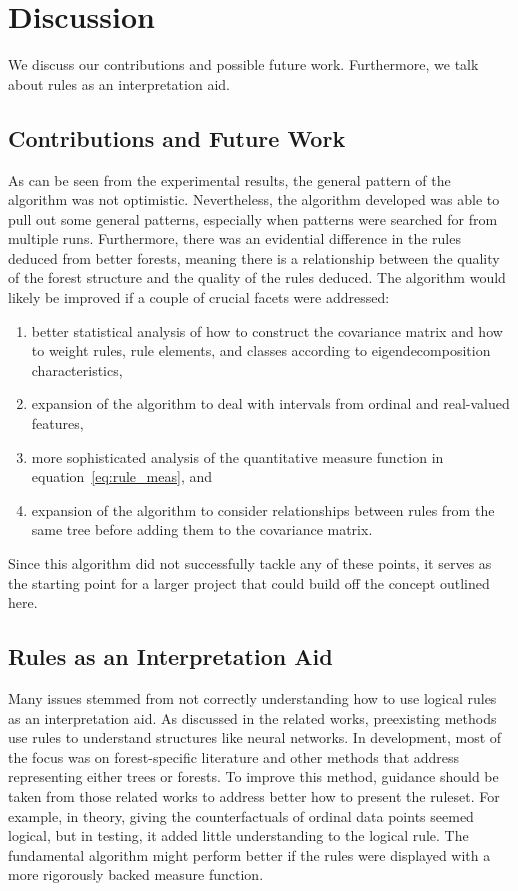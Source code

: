 \documentclass[11pt]{article}
\begin{document}

\section{Discussion}
\label{sec:dis}
We discuss our contributions and possible future work. Furthermore, we talk about rules as an interpretation aid. 
\subsection{Contributions and Future Work}
As can be seen from the experimental results, the general pattern of the algorithm was not optimistic. Nevertheless, the algorithm developed was able to pull out some general patterns, especially when patterns were searched for from multiple runs. Furthermore, there was an evidential difference in the rules deduced from better forests, meaning there is a relationship between the quality of the forest structure and the quality of the rules deduced. The algorithm would likely be improved if a couple of crucial facets were addressed:
\begin{enumerate}
\item better statistical analysis of how to construct the covariance matrix and how to weight rules, rule elements, and classes according to eigendecomposition characteristics, 
\item expansion of the algorithm to deal with intervals from ordinal and real-valued features,
\item more sophisticated analysis of the quantitative measure function in equation~\ref{eq:rule_meas}, and
\item expansion of the algorithm to consider relationships between rules from the same tree before adding them to the covariance matrix. 
\end{enumerate}
Since this algorithm did not successfully tackle any of these points, it serves as the starting point for a larger project that could build off the concept outlined here. 

\subsection{Rules as an Interpretation Aid}
Many issues stemmed from not correctly understanding how to use logical rules as an interpretation aid. As discussed in the related works, preexisting methods use rules to understand structures like neural networks. In development, most of the focus was on forest-specific literature and other methods that address representing either trees or forests. To improve this method, guidance should be taken from those related works to address better how to present the ruleset. For example, in theory, giving the counterfactuals of ordinal data points seemed logical, but in testing, it added little understanding to the logical rule. The fundamental algorithm might perform better if the rules were displayed with a more rigorously backed measure function. 
\end{document}
